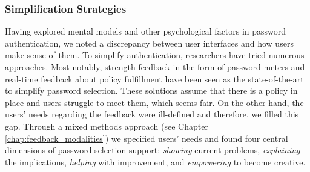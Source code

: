 \subsubsection{Simplification Strategies}
Having explored mental models and other psychological factors in password authentication, we noted a discrepancy between user interfaces and how users make sense of them. To simplify authentication, researchers have tried numerous approaches. Most notably, strength feedback in the form of password meters and real-time feedback about policy fulfillment have been seen as the state-of-the-art to simplify password selection. These solutions assume that there is a policy in place and users struggle to meet them, which seems fair. 
On the other hand, the users' needs regarding the feedback were ill-defined and therefore, we filled this gap. Through a mixed methods approach (see Chapter \ref{chap:feedback_modalities}) we specified users' needs and found four central dimensions of password selection support: \textit{showing} current problems, \textit{explaining} the implications, \textit{helping} with improvement, and \textit{empowering} to become creative.

